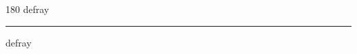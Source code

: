 
\begin{frame}
\begin{center}
\begin{turn}{180}
{\fontsize{2.5cm}{1em}\selectfont defray}
\end{turn}
\vspace{1em}\par  
\hrule
\vspace{1em}\par  
{\fontsize{2.5cm}{1em}\selectfont defray}
\end{center}
\end{frame}

